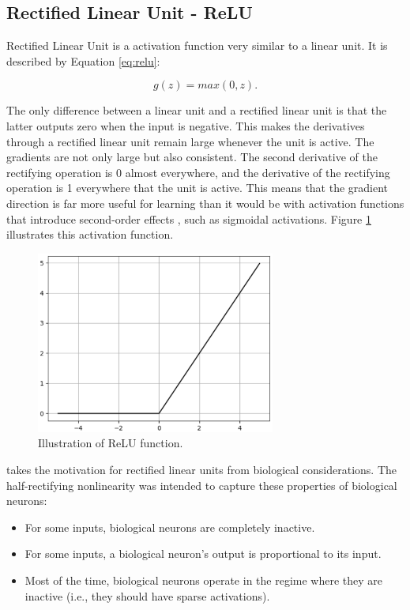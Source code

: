 \subsection{Rectified Linear Unit - ReLU}

Rectified Linear Unit is a activation function very similar to a linear unit. It is described by Equation \ref{eq:relu}:

\begin{equation}
g(z) = max(0,z).
\label{eq:relu}
\end{equation}

The only difference between a linear unit and a rectified linear unit is
that the latter outputs zero when the input is negative. This makes the
derivatives through a rectified linear unit remain large whenever the unit is active.
The gradients are not only large but also consistent. The second derivative of the
rectifying operation is 0 almost everywhere, and the derivative of the rectifying
operation is 1 everywhere that the unit is active. This means that the gradient
direction is far more useful for learning than it would be with activation functions
that introduce second-order effects \cite{Goodfellow-et-al-2016}, such as sigmoidal activations. Figure \ref{fig:relu} illustrates this activation function.

\begin{figure}[!htbp]
	\centering
	\includegraphics[width=0.7\textwidth]{Cap3/relu.eps}
	\caption{Illustration of ReLU function.}
	\label{fig:relu}
\end{figure}

\citeauthor{glorot2011a} takes the motivation for rectified linear units from
biological considerations. The half-rectifying nonlinearity was intended to capture
these properties of biological neurons: 
\begin{itemize}
\item For some inputs, biological neurons are
completely inactive. 
\item For some inputs, a biological neuron’s output is proportional
to its input. 
\item Most of the time, biological neurons operate in the regime where
they are inactive (i.e., they should have sparse activations).
\end{itemize}

